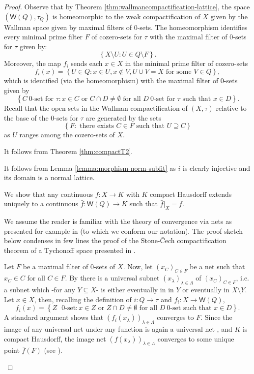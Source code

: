 \documentclass{article}
\newcommand{\corn}[1]{(\mathsf{W}(#1),\tau_{#1})}
\theoremstyle{plain}
\theoremstyle{definition}
\theoremstyle{remark}
\newcommand{\bool}[1]{\mathsf{#1}}
\newcommand{\bp}[1]{\left\lbrace #1 \right\rbrace}
\newcommand{\0}{\mathbbm 0}
\newcommand{\1}{\mathbbm 1}
\newcommand{\2}{\mathbbm 2}
\begin{document}
\begin{proof}
Observe that by Theorem \ref{thm:wallmancompactification-lattice}, the space $\corn{Q}$ is homeomorphic to the weak compactification of $X$ given by the Wallman space given by maximal filters of $0$-sets. The homeomorphism identifies every minimal prime filter $F$ of cozero-sets for $\tau$ with the maximal filter of $0$-sets for $\tau$ given by: 
\[
\bp{X \setminus U :U\in Q \setminus F }.
\]
Moreover, the map $f_i$ sends each $x \in X$ in the minimal prime filter of cozero-sets
\[ 
f_i(x) =\bp{U \in Q: x \in U, x \notin V, U \cup V = X \text{ for some } V \in Q},
\]
which is identified (via the homeomorphism) with the maximal filter of $0$-sets given by 
\[
\bp{C \ 0\text{-set for }\tau: x \in C \text{ or } C \cap D \neq \emptyset \text{ for all } D \ 0\text{-set for }\tau \text{ such that }x \in D}.
\]
Recall that the open sets in the Wallman compactification of $(X,\tau)$ relative to the base of the $0$-sets for $\tau$ are generated by the sets 
\[
\bp{F: \text{ there exists } C \in F \text{ such that } U \supseteq C}
\]
as $U$ ranges among the cozero-sets of $X$. 
\begin{description}[font=\normalfont\itshape]
\item[$\corn{Q}$ is compact Hausdorff.] It follows from Theorem \ref{thm:compactT2}.
\item[$f_i$ is a surjective continuous and closed map.] It follows from Lemma \ref{lemma:morphism-norm-subfit} as $i$ is clearly injective and its domain is a normal lattice.  
\item[ $(\mathsf{W}(Q), \tau_Q, f_i)$ satisfies the unique extension property.] We show that any continuous $f : X \to K$ with $K$ compact Hausdorff extends uniquely to a continuous $\bar{f} : \mathsf{W}(Q) \to K$ such that $\bar{f}|_X = f$. 

We assume the reader is familiar with the theory of convergence via nets as presented for example in \cite[Chapter 1]{pedersen1989analysis} (to which we conform our notation). The proof sketch below condenses in few lines the proof of the Stone-\v{C}ech compactification theorem of  a Tychonoff space presented in \cite[Thm. D.3.13]{VIABOOKFORCING}.

Let $F$ be a maximal filter of $0$-sets of $X$. Now, let $(x_C)_{C \in F}$ be a net such that $x_C \in C$ for all $C \in F$. 
By \cite[Theorem 1.3.8]{pedersen1989analysis} there is a universal subnet $(x_\lambda)_{\lambda\in\Lambda}$ of $(x_C)_{C \in F}$, i.e. a subnet which -for any $Y\subseteq X$- is either eventually in 
 in $Y$ or eventually in $X\setminus Y$.
Let $x \in X$, then, recalling the definition of $i:Q\to\tau$ and $f_i:X\to\bool{W}(Q)$,
\[
f_i(x)=\bp{Z \text{ } 0\text{-set}: x \in Z \text{ or } Z \cap D \neq \emptyset \text{ for all } D \ 0\text{-set} \text{ such that }x \in D}.
\]
A standard argument shows that $(f_i(x_\lambda))_{\lambda\in\Lambda}$ 
 converges to $F$. Since the image of any universal net under any function is again a universal net \cite[1.3.7]{pedersen1989analysis}, and  $K$ is compact Hausdorff, the image net $(f(x_\lambda))_{\lambda\in\Lambda}$ converges to some unique point $\bar{f}(F)$ (see \cite[Prop 1.5.2, Thm 1.6.2]{pedersen1989analysis}). 



\end{description}
\end{proof}
\end{document}
